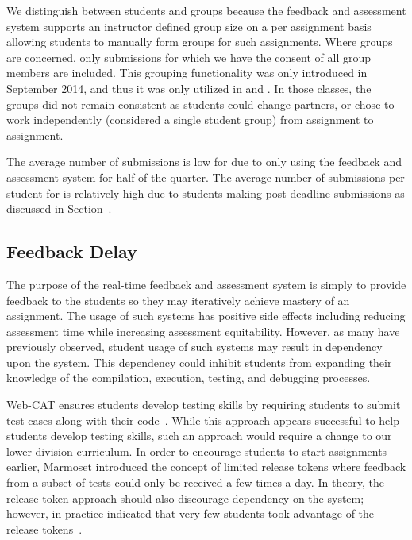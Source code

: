 We distinguish between students and groups because the feedback and assessment
system supports an instructor defined group size on a per assignment basis
allowing students to manually form groups for such assignments. Where groups
are concerned, only submissions for which we have the consent of all group
members are included. This grouping functionality was only introduced in
September 2014, and thus it was only utilized in  and
. In those classes, the groups did not remain consistent as students
could change partners, or chose to work independently (considered a single
student group) from assignment to assignment.

The average number of submissions is low for  due to only using the
feedback and assessment system for half of the quarter. The average number of
submissions per student for  is relatively high due to students
making post-deadline submissions as discussed in
Section~.


\subsection{Feedback Delay} 
The purpose of the real-time feedback and assessment system is simply to
provide feedback to the students so they may iteratively achieve mastery of an
assignment. The usage of such systems has positive side effects including
reducing assessment time while increasing assessment equitability. However, as
many have previously observed, student usage of such systems may result in
dependency upon the system. This dependency could inhibit students from
expanding their knowledge of the compilation, execution, testing, and debugging
processes.

Web-CAT ensures students develop testing skills by requiring students to submit
test cases along with their code~\cite{Edwards:2003:RCS:949344.949390}. While
this approach appears successful to help students develop testing skills, such
an approach would require a change to our lower-division curriculum. In order
to encourage students to start assignments earlier, Marmoset introduced the
concept of limited release tokens where feedback from a subset of tests could
only be received a few times a day. In theory, the release token approach
should also discourage dependency on the system; however, in practice \spacco{}
indicated that very few students took advantage of the release
tokens~\cite{Spacco:2013:TIP:2462476.2465594}.

